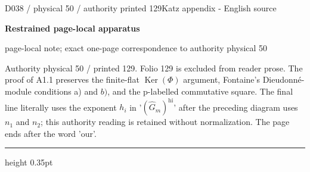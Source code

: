 \documentclass[9pt]{article}
\newcommand{\CanonText}[1]{\par{\fontsize{8.0}{9.35}\selectfont\RaggedRight #1\par}\vspace{2.2pt}}
\newcommand{\LayerTitle}{Restrained page-local apparatus}
\begin{document}
\noindent\begin{minipage}[t][\dimexpr\textheight-5pt\relax][t]{\textwidth}
{\sffamily\fontsize{7.3}{8.2}\selectfont\color{Quiet} D038 / physical 50 / authority printed 129\hfill Katz appendix - English source}
\par{}\vspace{4.5pt}
{\sffamily\fontsize{10.4}{11.6}\selectfont\bfseries\color{Accent} \LayerTitle}
\par{\sffamily\fontsize{6.7}{7.7}\selectfont\color{Quiet} page-local note; exact one-page correspondence to authority physical 50}
\vspace{5pt}
\CanonText{Authority physical 50 / printed 129. Folio 129 is excluded from reader prose. The proof of A1.1 preserves the finite-flat \(\operatorname{Ker}(\Phi{})\) argument, Fontaine's Dieudonné-module conditions a) and \(b)\), and the p-labelled commutative square. The final line literally uses the exponent \(h_{i}\) in '\((\widehat{G}_{m})^{\mathrm{hi}}\)' after the preceding diagram uses \(n_{1}\) and \(n_{2}\); this authority reading is retained without normalization. The page ends after the word 'our'.}
\vfill
{\color{Accent}\hrule height 0.35pt}\vspace{3pt}
\end{minipage}
\newpage
\end{document}
